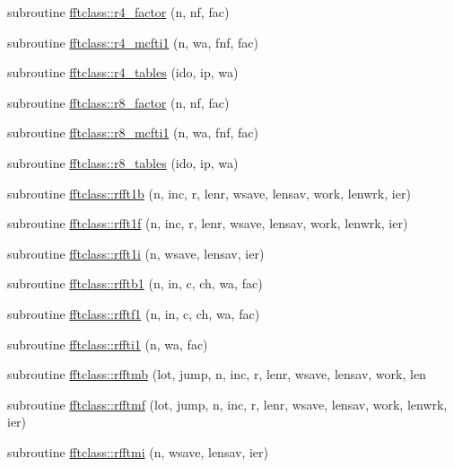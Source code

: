 \begin{DoxyCompactItemize}
\item 
subroutine \mbox{\hyperlink{namespacefftclass_ad76d163c3f3aec3b5a3bbb3285498ffd}{fftclass\+::r4\+\_\+factor}} (n, nf, fac)
\item 
subroutine \mbox{\hyperlink{namespacefftclass_aecf4238ff306578dd37cab143ce6efac}{fftclass\+::r4\+\_\+mcfti1}} (n, wa, fnf, fac)
\item 
subroutine \mbox{\hyperlink{namespacefftclass_a882cd8d6eeb407d2b10ee9b3d9fee8b9}{fftclass\+::r4\+\_\+tables}} (ido, ip, wa)
\item 
subroutine \mbox{\hyperlink{namespacefftclass_a22bddf5efe99e8dcd5737d2d73ae832f}{fftclass\+::r8\+\_\+factor}} (n, nf, fac)
\item 
subroutine \mbox{\hyperlink{namespacefftclass_a89d64713ecbaec08b4d5180fcbc56cea}{fftclass\+::r8\+\_\+mcfti1}} (n, wa, fnf, fac)
\item 
subroutine \mbox{\hyperlink{namespacefftclass_a68ac2e6dba058989d5e0d7fbee9aa19f}{fftclass\+::r8\+\_\+tables}} (ido, ip, wa)
\item 
subroutine \mbox{\hyperlink{namespacefftclass_a2bdd31e65a4abb79ed9e0eeaa71cee6b}{fftclass\+::rfft1b}} (n, inc, r, lenr, wsave, lensav, work, lenwrk, ier)
\item 
subroutine \mbox{\hyperlink{namespacefftclass_ad5aa2059236e01ea65aecda114c3f45f}{fftclass\+::rfft1f}} (n, inc, r, lenr, wsave, lensav, work, lenwrk, ier)
\item 
subroutine \mbox{\hyperlink{namespacefftclass_abb3d8b6f0166090db98de3e7d627434f}{fftclass\+::rfft1i}} (n, wsave, lensav, ier)
\item 
subroutine \mbox{\hyperlink{namespacefftclass_a338a7a4db13f2357c42a682142df3190}{fftclass\+::rfftb1}} (n, in, c, ch, wa, fac)
\item 
subroutine \mbox{\hyperlink{namespacefftclass_af9f24f143ca02395c91f7757343e8003}{fftclass\+::rfftf1}} (n, in, c, ch, wa, fac)
\item 
subroutine \mbox{\hyperlink{namespacefftclass_a122822a405cd96e5df936acaad731746}{fftclass\+::rffti1}} (n, wa, fac)
\item 
subroutine \mbox{\hyperlink{namespacefftclass_acc4295c5a3646519e26c3dd5ae66418d}{fftclass\+::rfftmb}} (lot, jump, n, inc, r, lenr, wsave, lensav, work, len
\item 
subroutine \mbox{\hyperlink{namespacefftclass_a4662111bc784aa321b0567a1a0578963}{fftclass\+::rfftmf}} (lot, jump, n, inc, r, lenr, wsave, lensav, work, lenwrk, ier)
\item 
subroutine \mbox{\hyperlink{namespacefftclass_a6a543283f910322f94293d719f923881}{fftclass\+::rfftmi}} (n, wsave, lensav, ier)

\end{DoxyCompactItemize}
